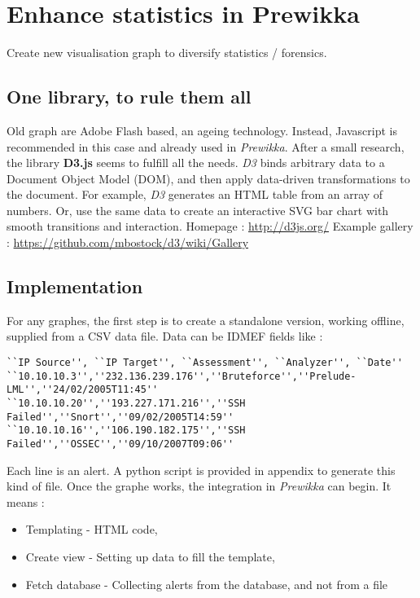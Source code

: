 \documentclass{koala-en}
\begin{document}
\thispagestyle{fancy}
\newpage

\section{Enhance statistics in Prewikka}
Create new visualisation graph to diversify statistics / forensics.
\subsection{One library, to rule them all}
Old graph are Adobe Flash based, an ageing technology.
\newline
\newline
Instead, Javascript is recommended in this case and already used in \emph{Prewikka}. After a small research, the library \textbf{D3.js} seems to fulfill all the needs.
\newline
\newline
\emph{D3} binds arbitrary data to a Document Object Model (DOM), and then apply data-driven transformations to the document. For example, \emph{D3} generates an HTML table from an array of numbers. Or, use the same data to create an interactive SVG bar chart with smooth transitions and interaction.
\newline
\newline
Homepage : \url{http://d3js.org/}
\newline
Example gallery : \url{https://github.com/mbostock/d3/wiki/Gallery}

\subsection{Implementation}
For any graphes, the first step is to create a standalone version, working offline, supplied from a CSV data file. Data can be IDMEF fields like :
\begin{lstlisting}
``IP Source'', ``IP Target'', ``Assessment'', ``Analyzer'', ``Date''
``10.10.10.3'',''232.136.239.176'',''Bruteforce'',''Prelude-LML'',''24/02/2005T11:45''
``10.10.10.20'',''193.227.171.216'',''SSH Failed'',''Snort'',''09/02/2005T14:59''
``10.10.10.16'',''106.190.182.175'',''SSH Failed'',''OSSEC'',''09/10/2007T09:06''
\end{lstlisting}

Each line is an alert. A python script is provided in appendix to generate this kind of file.
\newline
\newline
Once the graphe works, the integration in \emph{Prewikka} can begin. It means :
\begin{itemize}
  \item Templating - HTML code,
  \item Create view - Setting up data to fill the template,
  \item Fetch database - Collecting alerts from the database, and not from a file
\end{itemize}
\end{document}
